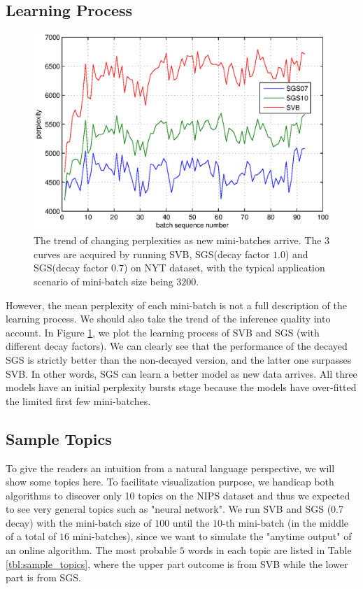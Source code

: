 \documentclass{article}
\begin{document}
\subsection{Learning Process}
\begin{figure}[ht]
\vskip 0.2in
\begin{center}
\centerline{\includegraphics[width=\columnwidth]{pics/pro2.eps}}
\caption{The trend of changing perplexities as new mini-batches arrive. The 3 curves are acquired by running SVB, SGS(decay factor $1.0$) and SGS(decay factor $0.7$) on NYT dataset, with the typical application scenario of mini-batch size being $3200$. }
\label{fig:pro}
\end{center}
\vskip -0.2in
\end{figure} 
However, the mean perplexity of each mini-batch is not a full description of the learning process. We should also take the trend of the inference quality into account. In Figure \ref{fig:pro}, we plot the learning process of SVB and SGS (with different decay factors). We can clearly see that the performance of the decayed SGS is strictly better than the non-decayed version, and the latter one surpasses SVB. In other words, SGS can learn a better model as new data arrives. All three models have an initial perplexity bursts stage because the models have over-fitted the limited first few mini-batches. 

\subsection{Sample Topics}
To give the readers an intuition from a natural language perspective, we will show some topics here. To facilitate visualization purpose, we handicap both algorithms to discover only 10 topics on the NIPS dataset and thus we expected to see very general topics such as "neural network". We run SVB and SGS ($0.7$ decay) with the mini-batch size of $100$ until the $10$-th mini-batch (in the middle of a total of $16$ mini-batches), since we want to simulate the "anytime output" of an online algorithm. The most probable $5$ words in each topic are listed in Table \ref{tbl:sample_topics}, where the upper part outcome is from SVB while the lower part is from SGS.
\end{document}
